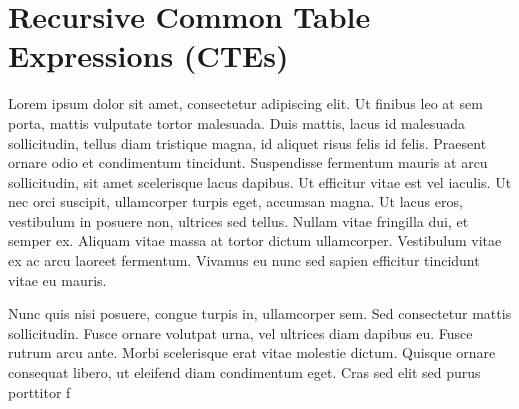 \section{Recursive Common Table Expressions (CTEs)}
Lorem ipsum dolor sit amet, consectetur adipiscing elit. Ut finibus leo at sem porta, mattis vulputate tortor malesuada. Duis mattis, lacus id malesuada sollicitudin, tellus diam tristique magna, id aliquet risus felis id felis. Praesent ornare odio et condimentum tincidunt. Suspendisse fermentum mauris at arcu sollicitudin, sit amet scelerisque lacus dapibus. Ut efficitur vitae est vel iaculis. Ut nec orci suscipit, ullamcorper turpis eget, accumsan magna. Ut lacus eros, vestibulum in posuere non, ultrices sed tellus. Nullam vitae fringilla dui, et semper ex. Aliquam vitae massa at tortor dictum ullamcorper. Vestibulum vitae ex ac arcu laoreet fermentum. Vivamus eu nunc sed sapien efficitur tincidunt vitae eu mauris.

Nunc quis nisi posuere, congue turpis in, ullamcorper sem. Sed consectetur mattis sollicitudin. Fusce ornare volutpat urna, vel ultrices diam dapibus eu. Fusce rutrum arcu ante. Morbi scelerisque erat vitae molestie dictum. Quisque ornare consequat libero, ut eleifend diam condimentum eget. Cras sed elit sed purus porttitor f